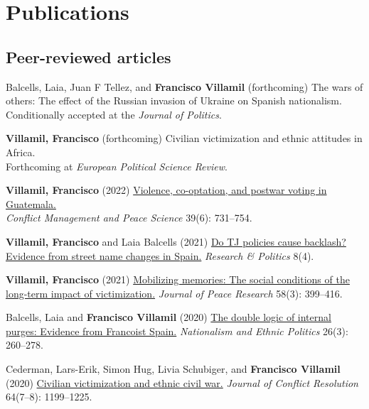 \documentclass[a4paper, 12pt]{article}
\begin{document}
\section*{Publications}

\subsection*{Peer-reviewed articles}

\begin{etaremune}[leftmargin=12pt, itemsep=0pt]
\item Balcells, Laia, Juan F Tellez, and \textbf{Francisco Villamil} (forthcoming) The wars of others: The effect of the Russian invasion of Ukraine on Spanish nationalism. Conditionally accepted at the \textit{Journal of Politics}.
\item \textbf{Villamil, Francisco} (forthcoming) Civilian victimization and ethnic attitudes in Africa.\\Forthcoming at \textit{European Political Science Review}.
\item \textbf{Villamil, Francisco} (2022) \href{https://journals.sagepub.com/doi/full/10.1177/07388942211066539}{Violence, co-optation, and postwar voting in Guatemala.}\\\textit{Conflict Management and Peace Science} 39(6): 731--754.
\item \textbf{Villamil, Francisco} and Laia Balcells (2021) \href{https://journals.sagepub.com/doi/full/10.1177/20531680211058550}{Do TJ policies cause backlash? Evidence from street name changes in Spain.} \textit{Research \& Politics} 8(4).
\item \textbf{Villamil, Francisco} (2021) \href{https://doi.org/10.1177/0022343320912816}{Mobilizing memories: The social conditions of the long-term impact of victimization.} \textit{Journal of Peace Research} 58(3): 399--416.
\item Balcells, Laia and \textbf{Francisco Villamil} (2020) \href{https://doi.org/10.1080/13537113.2020.1795451}{The double logic of internal purges: Evidence from Francoist Spain.} \textit{Nationalism and Ethnic Politics} 26(3): 260--278.
\item Cederman, Lars-Erik, Simon Hug, Livia Schubiger, and \textbf{Francisco Villamil} (2020) \href{https://doi.org/10.1177/0022002719898873}{Civilian victimization and ethnic civil war.} \textit{Journal of Conflict Resolution} 64(7--8): 1199--1225.
\end{etaremune}
\end{document}
